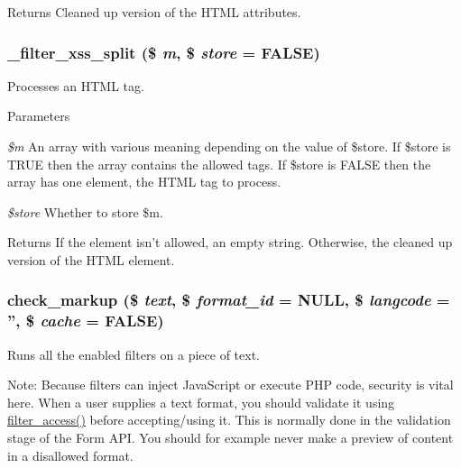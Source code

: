 \begin{DoxyReturn}{Returns}
Cleaned up version of the HTML attributes. 
\end{DoxyReturn}
\hypertarget{group__sanitization_ga1cc6cca885f021adcf11970b8ec4c846}{
\subsubsection[{\_\-filter\_\-xss\_\-split}]{\setlength{\rightskip}{0pt plus 5cm}\_\-filter\_\-xss\_\-split (\$ {\em m}, \/  \$ {\em store} = {\ttfamily FALSE})}}
\label{group__sanitization_ga1cc6cca885f021adcf11970b8ec4c846}
Processes an HTML tag.


\begin{DoxyParams}{Parameters}
\item[{\em \$m}]An array with various meaning depending on the value of \$store. If \$store is TRUE then the array contains the allowed tags. If \$store is FALSE then the array has one element, the HTML tag to process. \item[{\em \$store}]Whether to store \$m.\end{DoxyParams}
\begin{DoxyReturn}{Returns}
If the element isn't allowed, an empty string. Otherwise, the cleaned up version of the HTML element. 
\end{DoxyReturn}
\hypertarget{group__sanitization_gaa3872d938cf9ba93ed0621a6b26eaa59}{
\subsubsection[{check\_\-markup}]{\setlength{\rightskip}{0pt plus 5cm}check\_\-markup (\$ {\em text}, \/  \$ {\em format\_\-id} = {\ttfamily NULL}, \/  \$ {\em langcode} = {\ttfamily ''}, \/  \$ {\em cache} = {\ttfamily FALSE})}}
\label{group__sanitization_gaa3872d938cf9ba93ed0621a6b26eaa59}
Runs all the enabled filters on a piece of text.

Note: Because filters can inject JavaScript or execute PHP code, security is vital here. When a user supplies a text format, you should validate it using \hyperlink{filter_8module_aff74c90622b601df8e088f6b5c125bb7}{filter\_\-access()} before accepting/using it. This is normally done in the validation stage of the Form API. You should for example never make a preview of content in a disallowed format.


